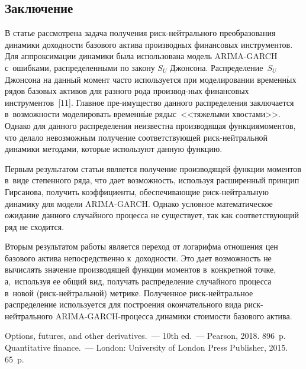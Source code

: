 \begin{multicols}{2}
\section{Заключение}
  
  В статье рассмотрена задача получения риск-нейт\-раль\-но\-го 
преобразования динамики до\-ход\-ности базового актива производных 
финансовых инструментов. Для аппроксимации динамики была использована 
модель ARIMA-GARCH с~ошибками, распределенными по закону $S_U$ 
Джонсона. Распределение~$S_U$ Джонсона на данный момент часто 
используется при моделировании временн$\acute{\mbox{ы}}$х рядов базовых активов для 
разного рода производ-\linebreak ных финансовых инструментов~[11]. Главное 
пре-\linebreak имущество данного распределения заключается в~воз\-мож\-ности 
моделировать временн$\acute{\mbox{ы}}$е ряды\linebreak с~<<тяжелыми хвостами>>. Однако для 
данного распределения неизвестна производящая функция\linebreak моментов, что 
делало невозможным получение со\-от\-вет\-ст\-ву\-ющей риск-нейт\-раль\-ной динамики 
методами, которые используют данную функцию. 
  
  Первым результатом статьи является получе\-ние производящей функции 
моментов в~виде сте\-пенного ряда, что дает возможность, используя 
рас\-ширенный принцип Гирсанова, получить ко\-эффициенты, обеспечивающие 
риск-нейтральную динамику для модели ARIMA-GARCH. Однако условное 
математическое ожидание данного случайного процесса не существует, так как 
соответствующий ряд не сходится. 

Вторым результатом работы является 
переход от логарифма отношения цен базового актива непосредственно 
к~доходности. Это дает возможность не вычислять значение производящей 
функции моментов в~конкретной точке, а,~используя ее общий вид, получать 
распределение случайного процесса в~новой (риск-нейт\-раль\-ной) метрике. 
Полученное риск-нейт\-раль\-ное распределение используется для построения 
окончательного вида риск-нейт\-раль\-но\-го ARIMA-GARCH-процесса 
динамики стоимости базового актива. 
  
 {\small\frenchspacing
 {%
 \begin{thebibliography}{99}
 Options, futures, and other derivatives.~--- 10th ed.~--- Pearson, 2018. 896~p.
 Quantitative finance.~--- London: University of London Press Publisher, 2015. 
65~p.


\end{thebibliography}}}
\end{multicols}
